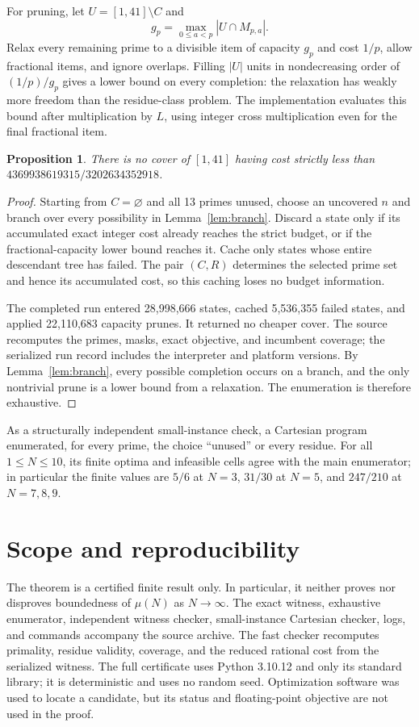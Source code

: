 \documentclass[11pt]{amsart}
\newtheorem{proposition}[theorem]{Proposition}
\begin{document}
For pruning, let $U=[1,41]\setminus C$ and
\[
 g_p=\max_{0\le a<p}|U\cap M_{p,a}|.
\]
Relax every remaining prime to a divisible item of capacity $g_p$ and cost
$1/p$, allow fractional items, and ignore overlaps.  Filling $|U|$ units in
nondecreasing order of $(1/p)/g_p$ gives a lower bound on every completion:
the relaxation has weakly more freedom than the residue-class problem.  The
implementation evaluates this bound after multiplication by $L$, using integer
cross multiplication even for the final fractional item.
\begin{proposition}\label{prop:enumeration}
There is no cover of $[1,41]$ having cost strictly less than
$4369938619315/3202634352918$.
\end{proposition}
\begin{proof}
Starting from $C=\varnothing$ and all 13 primes unused, choose an uncovered
$n$ and branch over every possibility in Lemma~\ref{lem:branch}.  Discard a
state only if its accumulated exact integer cost already reaches the strict
budget, or if the fractional-capacity lower bound reaches it.  Cache only
states whose entire descendant tree has failed.  The pair $(C,R)$ determines
the selected prime set and hence its accumulated cost, so this caching loses no
budget information.

The completed run entered 28,998,666 states, cached 5,536,355 failed states,
and applied 22,110,683 capacity prunes.  It returned no cheaper cover.  The
source recomputes the primes, masks, exact objective, and incumbent coverage;
the serialized run record includes the interpreter and platform versions.
By Lemma~\ref{lem:branch}, every possible completion occurs on a branch, and
the only nontrivial prune is a lower bound from a relaxation.  The enumeration
is therefore exhaustive.
\end{proof}

As a structurally independent small-instance check, a Cartesian program
enumerated, for every prime, the choice ``unused'' or every residue.  For all
$1\le N\le10$, its finite optima and infeasible cells agree with the main
enumerator; in particular the finite values are $5/6$ at $N=3$, $31/30$ at
$N=5$, and $247/210$ at $N=7,8,9$.

\section{Scope and reproducibility}
The theorem is a certified finite result only.  In particular, it neither
proves nor disproves boundedness of $\mu(N)$ as $N\to\infty$.  The exact
witness, exhaustive enumerator, independent witness checker, small-instance
Cartesian checker, logs, and commands accompany the source archive.  The fast
checker recomputes primality, residue validity, coverage, and the reduced
rational cost from the serialized witness.  The full certificate uses Python
3.10.12 and only its standard library; it is deterministic and uses no random
seed.  Optimization software was used to locate a candidate, but its status
and floating-point objective are not used in the proof.


\end{document}
